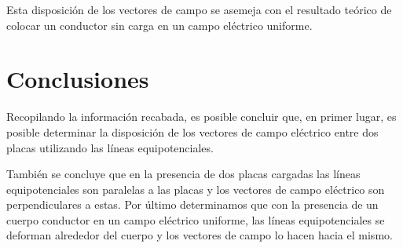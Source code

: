 \documentclass{article}
\begin{document}
Esta disposición de los vectores de campo se asemeja con el resultado teórico de colocar un conductor sin carga en un campo eléctrico uniforme.

\section{Conclusiones}

Recopilando la información recabada, es posible concluir que, en primer lugar, es posible determinar la disposición de los vectores de campo eléctrico entre dos placas utilizando las líneas equipotenciales. 

También se concluye que en la presencia de dos placas cargadas las líneas equipotenciales son paralelas a las placas y los vectores de campo eléctrico son perpendiculares a estas. Por último determinamos que con la presencia de un cuerpo conductor en un campo eléctrico uniforme, las líneas equipotenciales se deforman alrededor del cuerpo y los vectores de campo lo hacen hacia el mismo.
\end{document}
